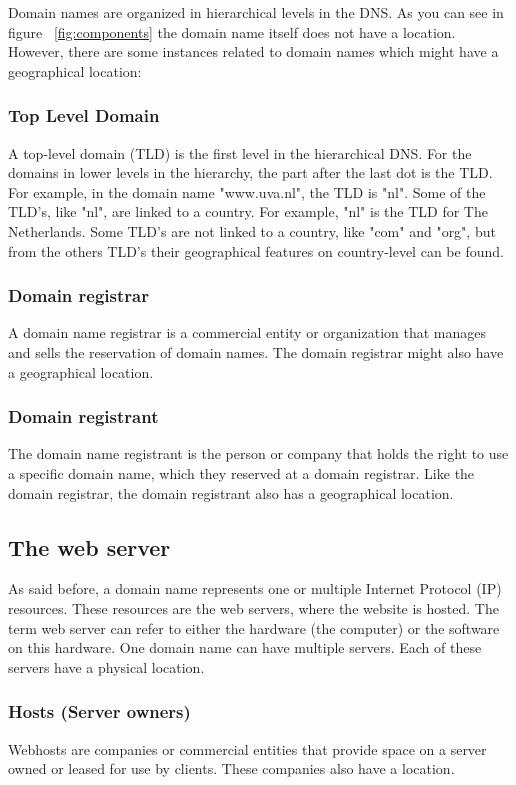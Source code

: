 \documentclass[twoside,openright,notitlepage]{uva-bachelor-thesis}
\begin{document}
Domain names are organized in hierarchical levels in the DNS. As you can see in figure ~\ref{fig:components} the domain name itself does not have a location. However, there are some instances related to domain names which might have a geographical location:

\subsubsection{Top Level Domain}
A top-level domain (TLD) is the first level in the hierarchical DNS. For the domains in lower levels in the hierarchy, the part after the last dot is the TLD. For example, in the domain name "www.uva.nl", the TLD is "nl". Some of the TLD's, like "nl", are linked to a country. For example, "nl" is the TLD for The Netherlands. Some TLD's are not linked to a country, like "com" and "org", but from the others TLD's their geographical features on country-level can be found.

\subsubsection{Domain registrar}
A domain name registrar is a commercial entity or organization that manages and sells the reservation of domain names. The domain registrar might also have a geographical location.

\subsubsection{Domain registrant}
The domain name registrant is the person or company that holds the right to use a specific domain name, which they reserved at a domain registrar.
Like the domain registrar, the domain registrant also has a geographical location.

\subsection{The web server}
As said before, a domain name represents one or multiple Internet Protocol (IP) resources. These resources are the web servers, where the website is hosted. The term web server can refer to either the hardware (the computer) or the software on this hardware. One domain name can have multiple servers. Each of these servers have a physical location.

\subsubsection{Hosts (Server owners)}
Webhosts are companies or commercial entities that provide space on a server owned or leased for use by clients. These companies also have a location.
\end{document}

